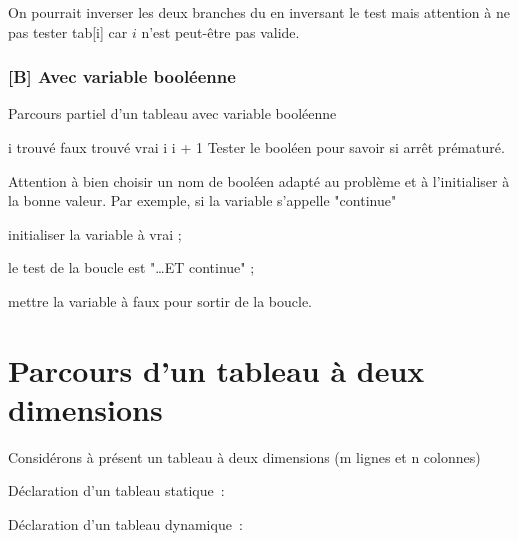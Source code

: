 On pourrait inverser les deux branches du  en inversant le test
mais attention à ne pas tester tab[i] car $i$ n'est peut-être pas valide.

\subsubsection*{[B] Avec variable booléenne}

\begin{algorithm}[H]
\begin{pseudo}
	\caption{Parcours partiel d'un tableau avec variable booléenne}
	\label{algo:parcours1-partiel-avec-bool}
	\Let i 
	\Let trouvé \Gets faux
			\Let trouvé \Gets vrai
		\Else
			\Let i \Gets i + 1
		\EndIf
	\EndWhile
	\LComment Tester le booléen pour savoir si arrêt prématuré.
\end{pseudo}
\end{algorithm}

Attention à bien choisir un nom de booléen adapté au problème
et à l'initialiser à la bonne valeur. 
Par exemple, si la variable s'appelle "continue"
\begin{liste}
\item initialiser la variable à vrai ;
\item le test de la boucle est "\dots ET continue" ;
\item mettre la variable à faux pour sortir de la boucle.
\end{liste}

\section{Parcours d'un tableau à deux dimensions}
\label{algo:Tab2D}

Considérons à présent un tableau à deux dimensions 
(m lignes et n colonnes)

Déclaration d'un tableau statique~:

Déclaration d'un tableau dynamique~:


